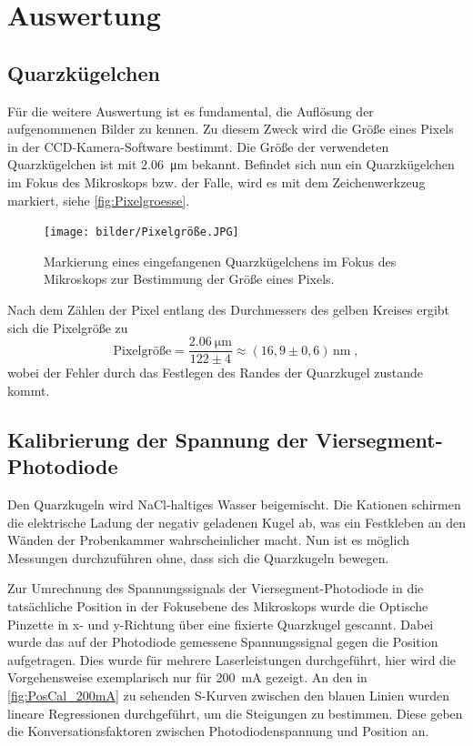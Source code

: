 \newpage
\section{Auswertung}

\subsection{Quarzkügelchen}
    Für die weitere Auswertung ist es fundamental, die Auflösung der aufgenommenen Bilder zu kennen.
    Zu diesem Zweck wird die Größe eines Pixels in der CCD-Kamera-Software bestimmt.
    Die Größe der verwendeten Quarzkügelchen ist mit \qty{2,06}{\um} bekannt.
    Befindet sich nun ein Quarzkügelchen im Fokus des Mikroskops bzw. der Falle, wird es mit dem Zeichenwerkzeug markiert, siehe \autoref{fig:Pixelgroesse}.
    \begin{figure}[ht]
        \centering\captionsetup{format=plain}
        \texttt{[image: bilder/Pixelgröße.JPG]}
        \caption{Markierung eines eingefangenen Quarzkügelchens im Fokus des Mikroskops zur Bestimmung der Größe eines Pixels.}
        \label{fig:Pixelgroesse}
    \end{figure}
    \FloatBarrier
    Nach dem Zählen der Pixel entlang des Durchmessers des gelben Kreises ergibt sich die Pixelgröße zu
    \begin{equation}
        \mathrm{Pixelgröße} = \frac{\SI{2,06}{\um}}{122 \pm 4} \approx (16,9 \pm 0,6)\,\si{\nm} \;,
    \end{equation}
    wobei der Fehler durch das Festlegen des Randes der Quarzkugel zustande kommt.

\subsection{Kalibrierung der Spannung der Viersegment-Photodiode}
    Den Quarzkugeln wird NaCl-haltiges Wasser beigemischt.
    Die Kationen schirmen die elektrische Ladung der negativ geladenen Kugel ab, was ein Festkleben an den Wänden der Probenkammer wahrscheinlicher macht.
    Nun ist es möglich Messungen durchzuführen ohne, dass sich die Quarzkugeln bewegen.

    Zur Umrechnung des Spannungssignals der Viersegment-Photodiode in die tatsächliche Position in der Fokusebene des Mikroskops wurde die Optische Pinzette in x- und y-Richtung über eine fixierte Quarzkugel gescannt.
    Dabei wurde das auf der Photodiode gemessene Spannungssignal gegen die Position aufgetragen.
    Dies wurde für mehrere Laserleistungen durchgeführt, hier wird die Vorgehensweise exemplarisch nur für \qty{200}{mA} gezeigt.
    An den in \autoref{fig:PosCal_200mA} zu sehenden S-Kurven zwischen den blauen Linien wurden lineare Regressionen durchgeführt, um die Steigungen zu bestimmen.
    Diese geben die Konversationsfaktoren zwischen Photodiodenspannung und Position an.

